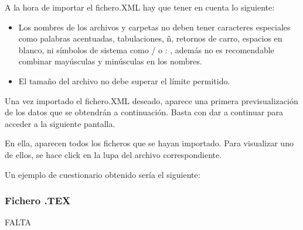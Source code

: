 A la hora de importar el fichero.XML hay que tener en cuenta lo siguiente:
\begin{itemize}
\item Los nombres de los archivos y carpetas no deben tener caracteres especiales como palabras acentuadas, tabulaciones, ñ, retornos de carro, espacios en blanco, ni símbolos de sistema como / o : , además no es recomendable combinar mayúsculas y minúsculas en los nombres.
\item El tamaño del archivo no debe superar el límite permitido.

\end{itemize} 

Una vez importado el fichero.XML deseado, aparece una primera previsualización de los datos que se obtendrán a continuación. Basta con dar a continuar para acceder a la siguiente pantalla.

En ella, aparecen todos los ficheros que se hayan importado. Para visualizar uno de ellos, se hace click en la lupa del archivo correspondiente.

Un ejemplo de cuestionario obtenido sería el siguiente:

\subsubsection{Fichero .TEX}

FALTA


